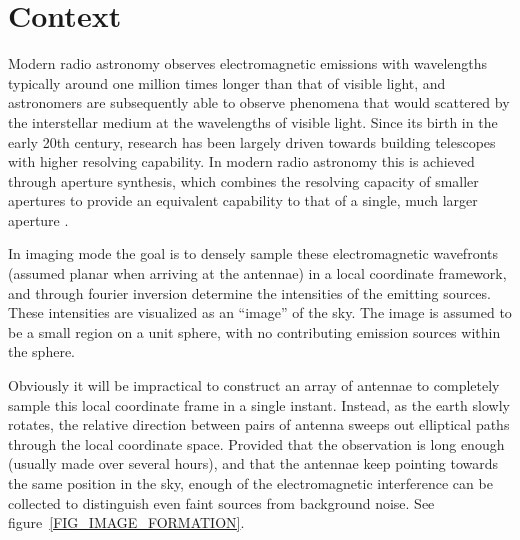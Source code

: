 \documentclass[a4paper, two column]{article}
\begin{document}
\saythanks
\section{Context}
Modern radio astronomy observes electromagnetic emissions with wavelengths typically around one million times longer than that of visible light, and astronomers are subsequently 
able to observe phenomena that would scattered by the interstellar medium at the wavelengths of visible light. Since its birth in the early 20th century, research has been largely 
driven towards building telescopes with higher resolving capability. In modern radio astronomy this is achieved through aperture synthesis, which combines the resolving capacity 
of smaller apertures to provide an equivalent capability to that of a single, much larger aperture \cite{christiansenradiotelescopes}.

In imaging mode the goal is to densely sample these electromagnetic wavefronts (assumed planar when arriving at the antennae) in a local coordinate framework, and through fourier inversion 
determine the intensities of the emitting sources. These intensities are visualized as an ``image'' of the sky. The image is assumed to be a small region on a unit sphere, with no 
contributing emission sources within the sphere.

Obviously it will be impractical to construct an array of antennae to completely sample this local coordinate frame in a single instant. Instead, as the earth slowly rotates, the 
relative direction between pairs of antenna sweeps out elliptical paths through the local coordinate space. Provided that the observation is long enough (usually made over several hours), 
and that the antennae keep pointing towards the same position in the sky, enough of the electromagnetic interference can be collected to distinguish even faint sources from 
background noise. See figure~\ref{FIG_IMAGE_FORMATION}.
\end{document}
